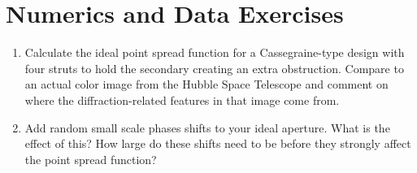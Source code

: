 \section{Numerics and Data Exercises}

\begin{enumerate}
\item Calculate the ideal point spread function for a Cassegraine-type
design with four struts to hold the secondary creating an extra
obstruction. Compare to an actual color image from the Hubble Space
Telescope and comment on where the diffraction-related features in
that image come from.
\item Add random small scale phases shifts to your ideal
aperture. What is the effect of this? How large do these shifts need
to be before they strongly affect the point spread function?
\end{enumerate}


  

